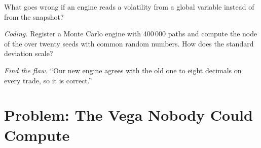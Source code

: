 \begin{exercise}[$\star\star$]\label{exo:dv:build-a-pricing-library:6}
What goes wrong if an engine reads a volatility from a global variable instead of from the snapshot?
\end{exercise}

\begin{exercise}[$\star\star\star$]\label{exo:dv:build-a-pricing-library:7}
\emph{Coding.} Register a Monte Carlo engine with 400\,000 paths and compute the node  of the  over twenty seeds with common random numbers. How does the
standard deviation scale?
\end{exercise}

\begin{exercise}[$\star\star\star$]\label{exo:dv:build-a-pricing-library:8}
\emph{Find the flaw.} ``Our new engine agrees with the old one to eight decimals on every trade, so it is correct.''
\end{exercise}

\section{Problem: The Vega Nobody Could Compute}

